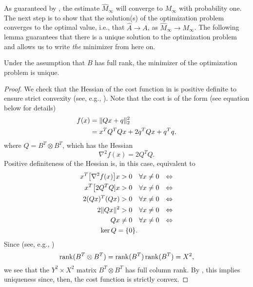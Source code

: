\documentclass[journal]{IEEEtran}
\begin{document}
As guaranteed by , the estimate $\hat M_\infty$ will
converge to $M_\infty$ with probability one. The next step is to
show that the solution(s) of the optimization problem 
converges to the optimal value, i.e., that $\hat A \rightarrow A$, as $\hat
M_\infty \rightarrow M_\infty$. The following lemma guarantees that there is
a unique solution to the optimization problem and allows us to write \emph{the}
minimizer from here on.
\begin{lemma}
    Under the assumption that $B$ has full rank, the minimizer of the
    optimization problem  is unique. 
    \label{lemma:unique_minimizer}
\end{lemma}
\begin{proof}
    We check that the Hessian of the cost function in  is
    positive definite to ensure strict convexity (see, e.g.,
    \cite{boyd_convex_2004}). Note that the cost is of the form (see equation
     below for details)
    \begin{align}
        f(x) &= \| Qx + q \|_2^2 \notag \\
             &= x^T Q^T Q x + 2 q^T Q x + q^T q,
            \label{eq:quad_cost}
    \end{align}
    where $Q = B^T \otimes B^T$, which has the Hessian
    \begin{equation}
        \nabla^2 f(x) = 2 Q^T Q.
    \end{equation}
    Positive definiteness of the Hessian is, in this case, equivalent to
    \begin{align}
        x^T \big[\nabla^2 f(x)\big] x > 0 &\quad\forall x \neq
        0 & \Leftrightarrow \notag \\
        x^T \big[2Q^T Q] x > 0 &\quad\forall x \neq 0 & \Leftrightarrow \notag \\
        2 (Qx)^T (Q x) > 0 &\quad\forall x \neq 0 & \Leftrightarrow \notag \\
        2 \| Qx \|^2 > 0 &\quad\forall x \neq 0 & \Leftrightarrow \notag \\
        Qx \neq 0 &\quad\forall x \neq 0 & \Leftrightarrow \notag \\
        \ker Q  = \{0&\}. &
        \label{eq:strict_convex}
    \end{align}
    Since (see, e.g., \cite{horn_topics_1991}) %
    \begin{equation}
        \operatorname{rank}(B^T \otimes B^T) = \operatorname{rank}(B^T)\operatorname{rank}(B^T) = X^2,
    \end{equation}
    we see that the $Y^2 \times X^2$ matrix $B^T \otimes B^T$ has full column
    rank. By , this implies uniqueness since, then, the
    cost function is strictly convex.
\end{proof}
\end{document}
